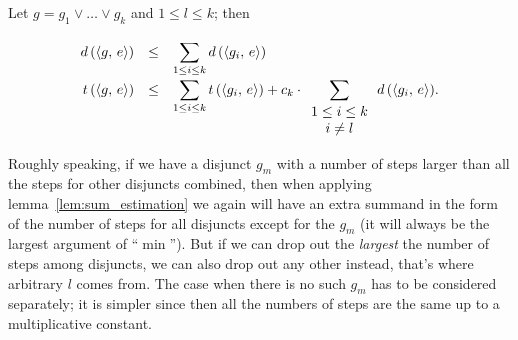 \begin{lemma}
\label{lem:disjunction_metrics_calc}

Let $g = g_1 \lor \dots \lor g_k$ and $1 \le l \le k$; then

\[
\renewcommand{\arraystretch}{1.5}
\begin{array}{rcl}
  d\,(\taskst{g}{e}) &\le& \displaystyle\sum\limits_{1 \le i \le k} d\,(\taskst{g_i}{e}) \\
  t\,(\taskst{g}{e}) &\le& \displaystyle\sum\limits_{1 \le i \le k} t\,(\taskst{g_i}{e}) + c_k\cdot \displaystyle\sum\limits_{\renewcommand{\arraystretch}{1}\begin{array}{c}1 \le i \le k \\ i \ne l\end{array}} d\,(\taskst{g_i}{e}).
\end{array}
\]

\end{lemma}

Roughly speaking, if we have a disjunct $g_m$ with a number of steps larger than all the steps for other disjuncts combined, then when applying lemma~\ref{lem:sum_estimation} we again will have an
extra summand in the form of the number of steps for all disjuncts except for the $g_m$ (it will always be the largest argument of ``$\min$''). But if we can drop out the \emph{largest}
the number of steps among disjuncts, we can also drop out any other instead, that's where arbitrary $l$ comes from. The case when there is no such $g_m$ has to be considered separately; it is simpler
since then all the numbers of steps are the same up to a multiplicative constant.

